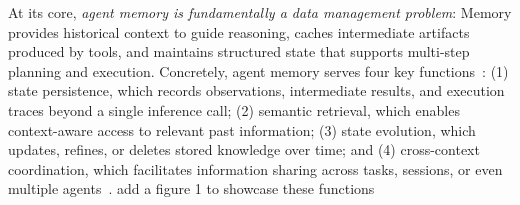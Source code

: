 \documentclass{llmxive}
\providecommand{\zxh}[1]{#1}
\begin{document}




At its core, \textit{agent memory is fundamentally a data management problem}: Memory provides historical context to guide reasoning, caches intermediate artifacts produced by tools, and maintains structured state that supports multi-step planning and execution. Concretely, agent memory serves four key functions~\cite{hu2025memory, packer2023memgpt}: (1) state persistence, which records observations, intermediate results, and execution traces beyond a single inference call; (2) semantic retrieval, which enables context-aware access to relevant past information; (3) state evolution, which updates, refines, or deletes stored knowledge over time; and (4) cross-context coordination, which facilitates information sharing across tasks, sessions, or even multiple agents~\cite{wang2025mirix}. \zxh{add a figure 1 to showcase these functions}
\end{document}
